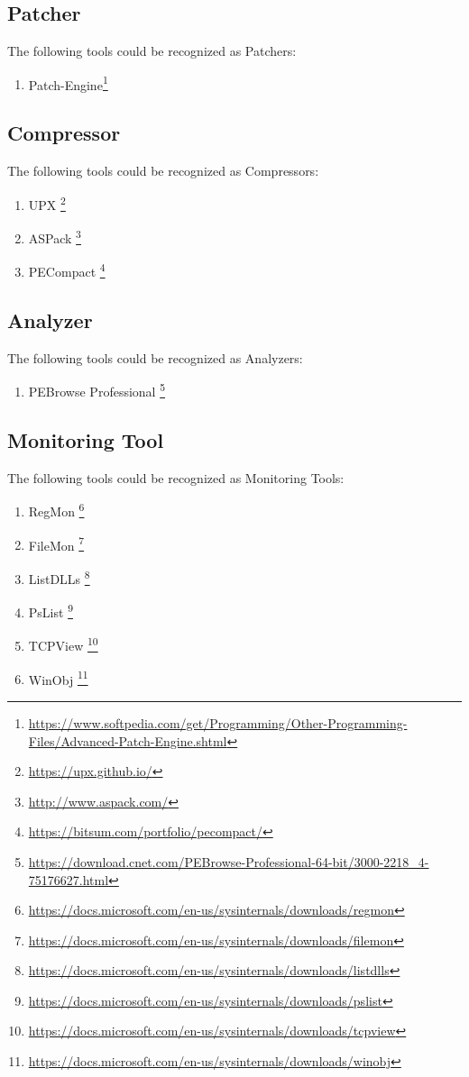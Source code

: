 \documentclass[twocolumn]{article}
\begin{document}
\subsection{Patcher}
The following tools could be recognized as Patchers:
\begin{enumerate}
	\item Patch-Engine\footnote{\url{https://www.softpedia.com/get/Programming/Other-Programming-Files/Advanced-Patch-Engine.shtml}}
\end{enumerate}

\subsection{Compressor}
The following tools could be recognized as Compressors:
\begin{enumerate}
	\item UPX \footnote{\url{https://upx.github.io/}}
	\item ASPack \footnote{\url{http://www.aspack.com/}}
	\item PECompact \footnote{\url{https://bitsum.com/portfolio/pecompact/}}
\end{enumerate}

\subsection{Analyzer}
The following tools could be recognized as Analyzers:
\begin{enumerate}
	\item PEBrowse Professional \footnote{\url{https://download.cnet.com/PEBrowse-Professional-64-bit/3000-2218_4-75176627.html}}
\end{enumerate}

\subsection{Monitoring Tool}
The following tools could be recognized as Monitoring Tools:
\begin{enumerate}	
	\item RegMon \footnote{\url{https://docs.microsoft.com/en-us/sysinternals/downloads/regmon}}
	\item FileMon \footnote{\url{https://docs.microsoft.com/en-us/sysinternals/downloads/filemon}}
	\item ListDLLs \footnote{\url{https://docs.microsoft.com/en-us/sysinternals/downloads/listdlls}}
	\item PsList \footnote{\url{https://docs.microsoft.com/en-us/sysinternals/downloads/pslist}}
	\item TCPView \footnote{\url{https://docs.microsoft.com/en-us/sysinternals/downloads/tcpview}}
	\item WinObj \footnote{\url{https://docs.microsoft.com/en-us/sysinternals/downloads/winobj}}
\end{enumerate}
\end{document}
